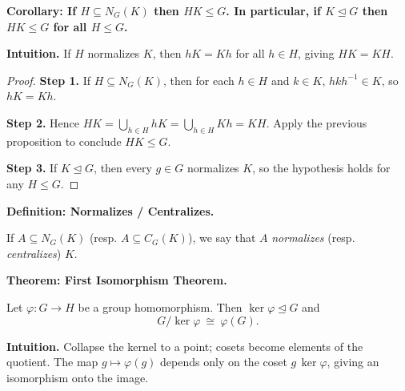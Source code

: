 \documentclass[9pt]{article}
\theoremstyle{definition}
\begin{document}
\noindent\textbf{Corollary: If $H\subseteq N_G(K)$ then $HK\le G$. In particular, if $K\trianglelefteq G$ then $HK\le G$ for all $H\le G$.}

\newpage

\dotfill

\noindent\textbf{Intuition.}
If $H$ normalizes $K$, then $hK=Kh$ for all $h\in H$, giving $HK=KH$.

\dotfill

\begin{proof}
\textbf{Step 1.} If $H\subseteq N_G(K)$, then for each $h\in H$ and $k\in K$, $hkh^{-1}\in K$, so $hK=Kh$.

\textbf{Step 2.} Hence $HK=\bigcup_{h\in H}hK=\bigcup_{h\in H}Kh=KH$. Apply the previous proposition to conclude $HK\le G$.

\textbf{Step 3.} If $K\trianglelefteq G$, then every $g\in G$ normalizes $K$, so the hypothesis holds for any $H\le G$.
\end{proof}

\newpage

\noindent\textbf{Definition: Normalizes / Centralizes.}

\newpage

If $A\subseteq N_G(K)$ (resp. $A\subseteq C_G(K)$), we say that $A$ \emph{normalizes} (resp. \emph{centralizes}) $K$.

\newpage


\noindent\textbf{Theorem: First Isomorphism Theorem.}

\newpage

Let $\varphi:G\to H$ be a group homomorphism. Then $\ker\varphi\trianglelefteq G$ and
\[
G/\ker\varphi\ \cong\ \varphi(G).
\]

\dotfill

\noindent\textbf{Intuition.}
Collapse the kernel to a point; cosets become elements of the quotient. The map $g\mapsto \varphi(g)$ depends only on the coset $g\,\ker\varphi$, giving an isomorphism onto the image.

\dotfill
\end{document}
